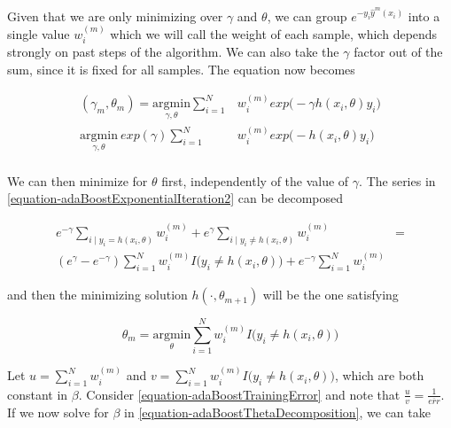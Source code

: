 Given that we are only minimizing over $\gamma$ and $\theta$, we can group $e^{-y_i  \hat{y}^{m}(x_i)}$ into a single value $w_i^{(m)}$ which we will call the weight of each sample, which depends strongly on past steps of the algorithm. We can also take the $\gamma$ factor out of the sum, since it is fixed for all samples. The equation now becomes

\begin{equation} \label{equation-adaBoostExponentialIteration2}
\begin{split}
(\gamma_{m}, \theta_{m}) = \underset{\gamma, \theta}{\mathrm{argmin}}  \sum_{i=1}^{N} &  w_i^{(m)} exp \big(- \gamma h(x_i,\theta)y_i \big) \\
 \underset{\gamma, \theta}{\mathrm{argmin}} \  exp(\gamma) \sum_{i=1}^{N} & w_i^{(m)} exp \big( - h(x_i,\theta)y_i \big) \\
\end{split}
\end{equation}

We can then minimize for $\theta$ first, independently of the value of $\gamma$. The series in \ref{equation-adaBoostExponentialIteration2} can be decomposed 

\begin{equation} \label{equation-adaBoostThetaDecomposition}
\begin{split}
e^{-\gamma} \sum_{i \mid y_i = h(x_i,\theta)} w_i^{(m)}  + e^{\gamma} \sum_{i \mid y_i \neq h(x_i,\theta)} w_i^{(m)} & = \\
( e^{\gamma} - e^{-\gamma}) \sum_{i = 1}^{N} w_i^{(m)} I \big( y_i \neq h(x_i,\theta)   \big)  + e^{-\gamma} \sum_{i = 1}^{N}   w_i^{(m)} &
\end{split}
\end{equation}


and then the minimizing solution $h(\cdot, \theta_{m+1})$ will be the one satisfying

 \begin{equation} \label{equation-adaBoostThetaMinimization}
  \theta_{m} = \underset{ \theta}{\mathrm{argmin}}  \sum_{i=1}^{N}  w_i^{(m)} I \big( y_i \neq h(x_i,\theta)   \big) 
 \end{equation}

Let $u = \sum_{i=1}^{N}  w_i^{(m)}$ and $v = \sum_{i=1}^{N}  w_i^{(m)} I \big( y_i \neq h(x_i,\theta)   \big) $, which are both constant in $\beta$. Consider \ref{equation-adaBoostTrainingError} and note that $\frac{u}{v} = \frac{1}{\overline{err}}$. If we now solve for $\beta$ in \ref{equation-adaBoostThetaDecomposition}, we can take

